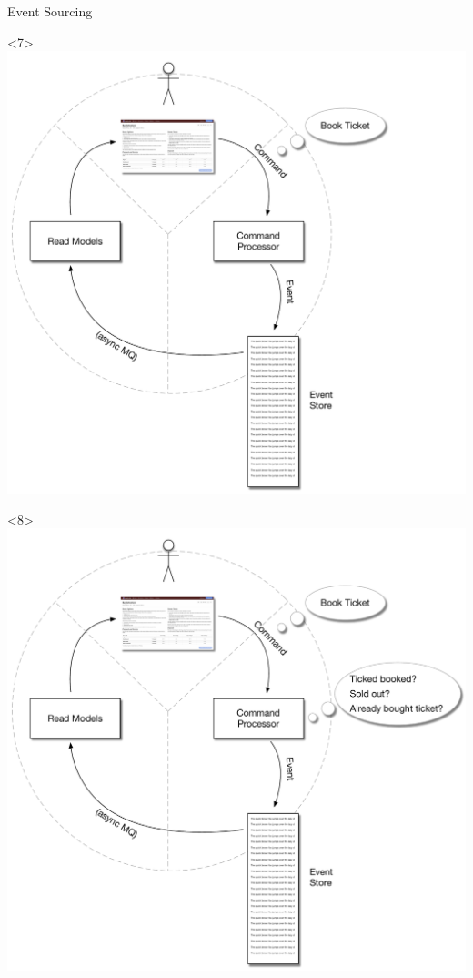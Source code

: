\begin{frame}[fragile]{Event Sourcing}
\begin{onlyenv}
\end{onlyenv}
\begin{onlyenv}<7>
\includegraphics[width=\WIDTH]{../EventSourcing3_1.pdf} %
\end{onlyenv}
\begin{onlyenv}<8>
\includegraphics[width=\WIDTH]{../EventSourcing3_2.pdf} %

\end{onlyenv}
\end{frame}

